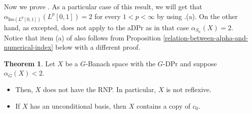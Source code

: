 \documentclass[a4paper,12pt]{amsart}
\theoremstyle{definition}
\newtheorem{theorem}{Theorem}[section]
\theoremstyle{definition}
\theoremstyle{remark}
\numberwithin{equation}{section}
\newcommand{\K}{\mathbb{K}}
\newcommand{\Iso}{\mathrm{Iso}}
\newcommand{\<}{\langle}
\renewcommand{\>}{\rangle}
\begin{document}
	Now we prove . As a particular case of this result, we will get that $\alpha_{\Iso(L^p[0,1])}(L^p[0,1])=2$ for every $1 < p < \infty$ by using .(a). On the other hand, as excepted,  does not apply to the aDPr as in that case $\alpha_{S_{\K}}(X) = 2$. Notice that item (a) of  also follows from Proposition \ref{relation-between-alpha-and-numerical-index} below with a different proof.
	
	\begin{theorem}\label{thm:GDPr-alphaG}
		Let $X$ be a $G$-Banach space with the $G$-DPr and suppose $\alpha_G(X)<2$. 
		
		\begin{itemize} 
			\item[(a)] Then, $X$ does not have the RNP. In particular, $X$ is not reflexive.
			\item[(b)] If $X$ has an unconditional basis, then $X$ contains a copy of $c_0$.
		\end{itemize}
	\end{theorem}
\end{document}
